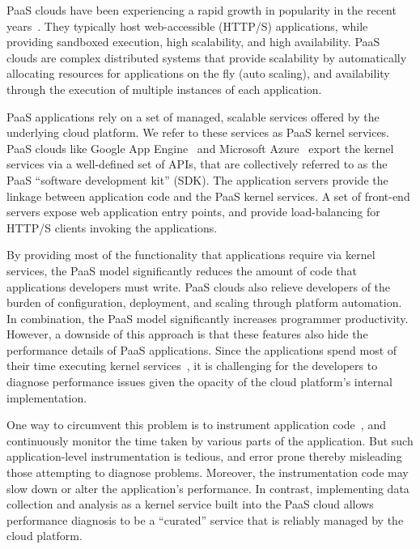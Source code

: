 PaaS clouds have been experiencing a rapid growth in 
popularity in the recent years~\cite{paas-growth,paas-growth2}. They
typically host web-accessible (HTTP/S) applications, while providing
sandboxed execution, high scalability, and high availability.
PaaS clouds are complex distributed systems that
provide scalability by automatically allocating resources for
applications on the fly (auto scaling), and availability through the
execution of multiple instances of each application.  

PaaS applications rely on a set of managed, scalable services 
offered by the underlying cloud platform. We refer to these services as 
PaaS kernel services. PaaS clouds like Google
App Engine~\cite{gae} and Microsoft Azure~\cite{azure} export
the kernel services via a well-defined set of APIs, that are collectively
referred to as the PaaS ``software development kit'' (SDK). The application
servers provide the linkage between application code and the PaaS kernel
services. A set of front-end servers expose web application entry points, and
provide load-balancing for HTTP/S clients invoking the applications.

By providing most of the functionality that applications require via
kernel services, the PaaS model significantly reduces the amount of code that applications developers
must write.  PaaS clouds also relieve developers of the burden of configuration, 
deployment, and scaling through platform automation.  In combination, the PaaS model
significantly increases programmer productivity.
However, a downside of this approach is that these features also hide
the performance details of PaaS applications. 
Since the applications spend most of their time executing kernel 
services~\cite{Jayathilaka:2015:RTS:2806777.2806842},
it is challenging for the developers to diagnose performance issues given the
opacity of the cloud platform's internal implementation. 

One way to circumvent this 
problem is to instrument application code~\cite{newrelic,datadog,dynatrace}, 
and continuously monitor the time taken by various
parts of the application. But such application-level instrumentation is tedious, and
error prone thereby misleading those attempting to diagnose problems.
Moreover, the instrumentation code may slow down or alter the application's
performance. 
In contrast, implementing data collection and analysis as a kernel service 
built into the PaaS cloud allows 
performance diagnosis to be a ``curated'' service that is 
reliably managed by the cloud platform.

